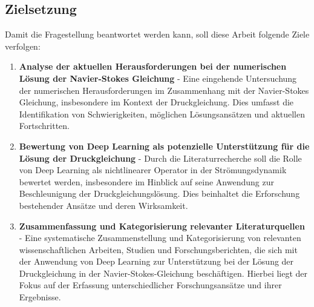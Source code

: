 \subsection{Zielsetzung}
Damit die Fragestellung beantwortet werden kann, soll diese Arbeit folgende Ziele verfolgen:

\begin{enumerate}
    \item \textbf{Analyse der aktuellen Herausforderungen bei der numerischen Lösung der Navier-Stokes Gleichung} - Eine eingehende Untersuchung der numerischen Herausforderungen im Zusammenhang mit der Navier-Stokes Gleichung, insbesondere im Kontext der Druckgleichung. Dies umfasst die Identifikation von Schwierigkeiten, möglichen Lösungsansätzen und aktuellen Fortschritten.
    \item \textbf{Bewertung von Deep Learning als potenzielle Unterstützung für die Lösung der Druckgleichung} - Durch die Literaturrecherche soll die Rolle von Deep Learning als nichtlinearer Operator in der Strömungsdynamik bewertet werden, insbesondere im Hinblick auf seine Anwendung zur Beschleunigung der Druckgleichungslösung. Dies beinhaltet die Erforschung bestehender Ansätze und deren Wirksamkeit.
    \item \textbf{Zusammenfassung und Kategorisierung relevanter Literaturquellen} - Eine systematische Zusammenstellung und Kategorisierung von relevanten wissenschaftlichen Arbeiten, Studien und Forschungsberichten, die sich mit der Anwendung von Deep Learning zur Unterstützung bei der Lösung der Druckgleichung in der Navier-Stokes-Gleichung beschäftigen. Hierbei liegt der Fokus auf der Erfassung unterschiedlicher Forschungsansätze und ihrer Ergebnisse.
\end{enumerate}